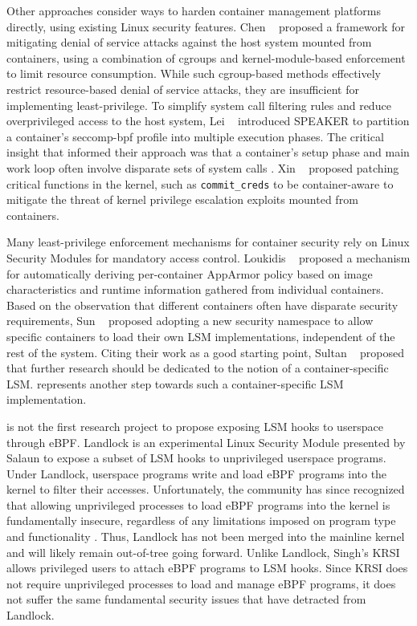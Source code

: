Other approaches consider ways to harden container management platforms directly, using existing Linux security features. Chen \etal~\cite{chen2019_container_dos} proposed a framework for mitigating denial of service attacks against the host system mounted from containers, using a combination of cgroups and kernel-module-based enforcement to limit resource consumption. While such cgroup-based methods effectively restrict resource-based denial of service attacks, they are insufficient for implementing least-privilege. To simplify system call filtering rules and reduce overprivileged access to the host system, Lei \etal~\cite{lei2017_speaker} introduced SPEAKER to partition a container's seccomp-bpf profile into multiple execution phases. The critical insight that informed their approach was that a container's setup phase and main work loop often involve disparate sets of system calls \cite{lei2017_speaker}. Xin \etal~\cite{xin2018_container_security} proposed patching critical functions in the kernel, such as \texttt{commit\_creds} to be container-aware to mitigate the threat of kernel privilege escalation exploits mounted from containers.

Many least-privilege enforcement mechanisms for container security rely on Linux Security Modules for mandatory access control. Loukidis \etal~\cite{loukidis2018_dockersec} proposed a mechanism for automatically deriving per-container AppArmor policy based on image characteristics and runtime information gathered from individual containers. Based on the observation that different containers often have disparate security requirements, Sun \etal~\cite{sun2018_security_namespace} proposed adopting a new security namespace to allow specific containers to load their own LSM implementations, independent of the rest of the system. Citing their work as a good starting point, Sultan \etal~\cite{sultan2019_container_security} proposed that further research should be dedicated to the notion of a container-specific LSM. \bpfcontain{} represents another step towards such a container-specific LSM implementation.

\bpfcontain{} is not the first research project to propose exposing LSM hooks to userspace through eBPF. Landlock \cite{landlockio,landlock_patch} is an experimental Linux Security Module presented by Salaun to expose a subset of LSM hooks to unprivileged userspace programs. Under Landlock, userspace programs write and load eBPF programs into the kernel to filter their accesses. Unfortunately, the community has since recognized that allowing unprivileged processes to load eBPF programs into the kernel is fundamentally insecure, regardless of any limitations imposed on program type and functionality \cite{corbet2019_krsi}. Thus, Landlock has not been merged into the mainline kernel and will likely remain out-of-tree going forward. Unlike Landlock, Singh's KRSI \cite{corbet2019_krsi,singh2019_krsi} allows privileged users to attach eBPF programs to LSM hooks. Since KRSI does not require unprivileged processes to load and manage eBPF programs, it does not suffer the same fundamental security issues that have detracted from Landlock.


